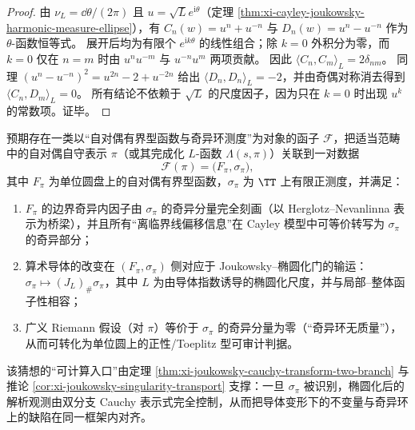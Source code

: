 \begin{proof}
由 \(\nu_L=\dd\theta/(2\pi)\) 且 \(u=\sqrt{L}e^{\mathrm{i}\theta}\)（定理 \ref{thm:xi-cayley-joukowsky-harmonic-measure-ellipse}），有 \(C_n(w)=u^n+u^{-n}\) 与 \(D_n(w)=u^n-u^{-n}\) 作为 \(\theta\)-函数恒等式。
展开后均为有限个 \(e^{\mathrm{i}k\theta}\) 的线性组合；除 \(k=0\) 外积分为零，而 \(k=0\) 仅在 \(n=m\) 时由 \(u^n u^{-m}\) 与 \(u^{-n}u^m\) 两项贡献。
因此 \(\langle C_n,C_m\rangle_L=2\delta_{nm}\)。
同理 \((u^n-u^{-n})^2=u^{2n}-2+u^{-2n}\) 给出 \(\langle D_n,D_n\rangle_L=-2\)，并由奇偶对称消去得到 \(\langle C_n,D_m\rangle_L=0\)。
所有结论不依赖于 \(\sqrt{L}\) 的尺度因子，因为只在 \(k=0\) 时出现 \(u^k\) 的常数项。证毕。
\end{proof}

\begin{conjecture}\label{conj:xi-singular-ring-langlands-riemann-auditable-functor}
预期存在一类以“自对偶有界型函数与奇异环测度”为对象的函子 \(\mathcal F\)，把适当范畴中的自对偶自守表示 \(\pi\)（或其完成化 \(L\)-函数 \(\Lambda(s,\pi)\)）关联到一对数据
\[
\mathcal F(\pi)=\bigl(F_\pi,\sigma_\pi\bigr),
\]
其中 \(F_\pi\) 为单位圆盘上的自对偶有界型函数，\(\sigma_\pi\) 为 \(\TT\) 上有限正测度，并满足：
\begin{enumerate}
  \item \(F_\pi\) 的边界奇异内因子由 \(\sigma_\pi\) 的奇异分量完全刻画（以 Herglotz--Nevanlinna 表示为桥梁），并且所有“离临界线偏移信息”在 Cayley 模型中可等价转写为 \(\sigma_\pi\) 的奇异部分；
  \item 算术导体的改变在 \((F_\pi,\sigma_\pi)\) 侧对应于 Joukowsky--椭圆化门的输运：\(\sigma_\pi\mapsto (J_L)_\#\sigma_\pi\)，其中 \(L\) 为由导体指数诱导的椭圆化尺度，并与局部--整体函子性相容；
  \item 广义 Riemann 假设（对 \(\pi\)）等价于 \(\sigma_\pi\) 的奇异分量为零（“奇异环无质量”），从而可转化为单位圆上的正性/Toeplitz 型可审计判据。
\end{enumerate}
该猜想的“可计算入口”由定理 \ref{thm:xi-joukowsky-cauchy-transform-two-branch} 与推论 \ref{cor:xi-joukowsky-singularity-transport} 支撑：一旦 \(\sigma_\pi\) 被识别，椭圆化后的解析观测由双分支 Cauchy 表示式完全控制，从而把导体变形下的不变量与奇异环上的缺陷在同一框架内对齐。
\end{conjecture}

\endinput

